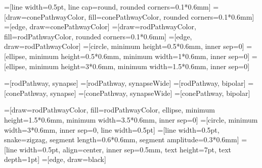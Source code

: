 \usetikzlibrary{shapes.geometric, snakes, calc}



\newcommand{\unit}{0.6mm}
\newcommand{\nRods}{3}
\newcommand{\lineWidth}{0.5pt}
\newcommand{\synDist}{0.0*\unit}
\newcommand{\bpShift}{3*\unit}
\newcommand{\amaShift}{0.75*\unit}
\newcommand{\rgcShift}{3*\unit}


=[line width=\lineWidth, line cap=round, rounded corners=0.1*\unit]
=[draw=conePathwayColor, fill=conePathwayColor, rounded corners=0.1*\unit]
=[edge, draw=conePathwayColor]
=[draw=rodPathwayColor, fill=rodPathwayColor, rounded corners=0.1*\unit]
=[edge, draw=rodPathwayColor]
=[circle, minimum height=0.5*\unit, inner sep=0]
=[ellipse, minimum height=0.5*\unit, minimum width=1*\unit, inner sep=0]
=[ellipse, minimum height=3*\unit, minimum width=1.5*\unit, inner sep=0]

=[rodPathway, synapse]
=[rodPathway, synapseWide]
=[rodPathway, bipolar]
=[conePathway, synapse]
=[conePathway, synapseWide]
=[conePathway, bipolar]

=[draw=rodPathwayColor, fill=rodPathwayColor, ellipse, minimum height=1.5*\unit, minimum width=3.5*\unit, inner sep=0]
=[circle, minimum width=3*\unit, inner sep=0, line width=\lineWidth]
=[line width=\lineWidth, snake=zigzag, segment length=0.6*\unit, segment amplitude=0.3*\unit]
=[line width=\lineWidth, align=center, inner sep=0.5mm, text height=7pt, text depth=1pt]
=[edge, draw=black]

